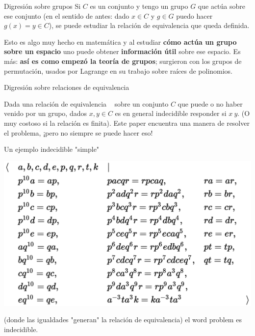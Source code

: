 \documentclass[10pt]{beamer}
\begin{document}
\begin{frame}{Digresión sobre grupos}
Si $C$ es un conjunto y tengo un grupo $G$ que actúa sobre ese conjunto (en el sentido de antes: dado $x \in C$ y $g \in G$ puedo hacer $g(x)=y\in C$), se puede estudiar la relación de equivalencia que queda definida.

Esto es algo muy hecho en matemática y al estudiar \textbf{cómo actúa un grupo sobre un espacio} uno puede obtener \textbf{información útil} sobre ese espacio. Es más: \textbf{así es como empezó la teoría de grupos}; surgieron con los grupos de permutación, usados por Lagrange en su trabajo sobre raíces de polinomios.


\end{frame}

\begin{frame}{Digresión sobre relaciones de equivalencia}

Dada una relación de equivalencia ~ sobre un conjunto $C$ que puede o no haber venido por un grupo, dados $x,y\in C$ es en general indecidible responder si $x~y$. (O muy costoso si la relación es finita). Este paper encuentra una manera de resolver el problema, ¡pero no siempre se puede hacer eso! \pause

\end{frame}


\begin{frame}{Un ejemplo indecidible "simple"}

\includegraphics[scale=0.35]{unsolvable.png}

(donde las igualdades "generan" la relación de equivalencia) el word problem es indecidible.
\end{frame}
\end{document}
